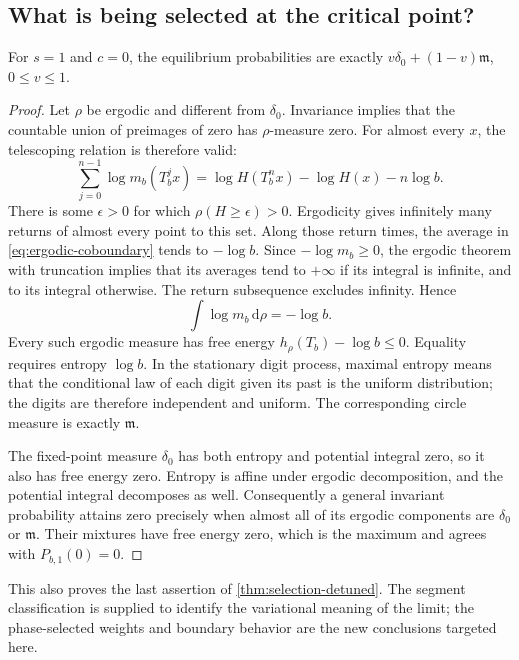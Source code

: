 \documentclass[11pt,a4paper]{article}
\numberwithin{equation}{section}
\theoremstyle{definition}
\theoremstyle{remark}
\newcommand{\dd}{\,\mathrm d}
\newcommand{\Leb}{\mathfrak m}
\begin{document}
\subsection{What is being selected at the critical point?}
\begin{proposition}
\label{prop:segment}
For $s=1$ and $c=0$, the equilibrium probabilities are exactly
$v\delta_0+(1-v)\Leb$, $0\le v\le1$.
\end{proposition}
\begin{proof}
Let $\rho$ be ergodic and different from $\delta_0$. Invariance implies
that the countable union of preimages of zero has $\rho$-measure zero.
For almost every $x$, the telescoping relation is therefore valid:
\begin{equation}
 \sum_{j=0}^{n-1}\log m_b(T_b^jx)
 =\log H(T_b^nx)-\log H(x)-n\log b.
 \label{eq:ergodic-coboundary}
\end{equation}
There is some $\epsilon>0$ for which $\rho(H\ge\epsilon)>0$.
Ergodicity gives infinitely many returns of almost every point to this
set. Along those return times, the average in
\cref{eq:ergodic-coboundary} tends to $-\log b$.
Since $-\log m_b\ge0$, the ergodic theorem with truncation implies that
its averages tend to $+\infty$ if its integral is infinite, and to its
integral otherwise. The return subsequence excludes infinity. Hence
\begin{equation}
 \int\log m_b\dd\rho=-\log b.
 \label{eq:ergodic-potential}
\end{equation}
Every such ergodic measure has free energy
$h_\rho(T_b)-\log b\le0$. Equality requires entropy $\log b$.
In the stationary digit process, maximal entropy means that the
conditional law of each digit given its past is the uniform distribution;
the digits are therefore independent and uniform. The corresponding
circle measure is exactly $\Leb$.

The fixed-point measure $\delta_0$ has both entropy and potential
integral zero, so it also has free energy zero. Entropy is affine under
ergodic decomposition, and the potential integral decomposes as well.
Consequently a general invariant probability attains zero precisely
when almost all of its ergodic components are $\delta_0$ or $\Leb$.
Their mixtures have free energy zero, which is the maximum and agrees
with $P_{b,1}(0)=0$.
\end{proof}
This also proves the last assertion of \cref{thm:selection-detuned}.
The segment classification is supplied to identify the variational
meaning of the limit; the phase-selected weights and boundary behavior
are the new conclusions targeted here.
\end{document}
